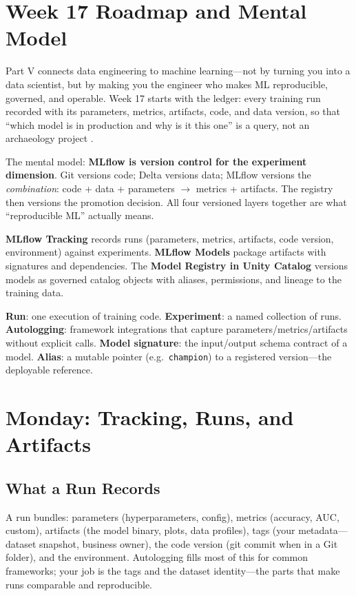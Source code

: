 \section{Week 17 Roadmap and Mental Model}
Part V connects data engineering to machine learning---not by turning you into a data scientist, but by making you the engineer who makes ML reproducible, governed, and operable. Week 17 starts with the ledger: every training run recorded with its parameters, metrics, artifacts, code, and data version, so that ``which model is in production and why is it this one'' is a query, not an archaeology project \cite{mlflowDocs,databricksMLflow}.

The mental model: \textbf{MLflow is version control for the experiment dimension}. Git versions code; Delta versions data; MLflow versions the \emph{combination}: code + data + parameters $\rightarrow$ metrics + artifacts. The registry then versions the promotion decision. All four versioned layers together are what ``reproducible ML'' actually means.

\begin{definitionbox}
\textbf{MLflow Tracking} records runs (parameters, metrics, artifacts, code version, environment) against experiments. \textbf{MLflow Models} package artifacts with signatures and dependencies. The \textbf{Model Registry in Unity Catalog} versions models as governed catalog objects with aliases, permissions, and lineage to the training data.
\end{definitionbox}

\begin{keyterms}
\textbf{Run}: one execution of training code. \textbf{Experiment}: a named collection of runs. \textbf{Autologging}: framework integrations that capture parameters/metrics/artifacts without explicit calls. \textbf{Model signature}: the input/output schema contract of a model. \textbf{Alias}: a mutable pointer (e.g.\ \texttt{champion}) to a registered version---the deployable reference.
\end{keyterms}

\section{Monday: Tracking, Runs, and Artifacts}
\subsection{What a Run Records}
A run bundles: parameters (hyperparameters, config), metrics (accuracy, AUC, custom), artifacts (the model binary, plots, data profiles), tags (your metadata---dataset snapshot, business owner), the code version (git commit when in a Git folder), and the environment. Autologging fills most of this for common frameworks; your job is the tags and the dataset identity---the parts that make runs comparable and reproducible.

